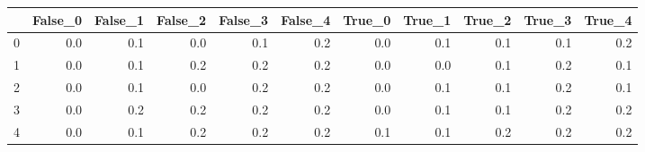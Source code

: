\begin{tabular}{lrrrrrrrrrr}
\toprule
{} &  False\_0 &  False\_1 &  False\_2 &  False\_3 &  False\_4 &  True\_0 &  True\_1 &  True\_2 &  True\_3 &  True\_4 \\ \hline
\midrule
0 &      0.0 &      0.1 &      0.0 &      0.1 &      0.2 &     0.0 &     0.1 &     0.1 &     0.1 &     0.2 \\ \hline
1 &      0.0 &      0.1 &      0.2 &      0.2 &      0.2 &     0.0 &     0.0 &     0.1 &     0.2 &     0.1 \\ \hline
2 &      0.0 &      0.1 &      0.0 &      0.2 &      0.2 &     0.0 &     0.1 &     0.1 &     0.2 &     0.1 \\ \hline
3 &      0.0 &      0.2 &      0.2 &      0.2 &      0.2 &     0.0 &     0.1 &     0.1 &     0.2 &     0.2 \\ \hline
4 &      0.0 &      0.1 &      0.2 &      0.2 &      0.2 &     0.1 &     0.1 &     0.2 &     0.2 &     0.2 \\ \hline
\bottomrule
\end{tabular}
